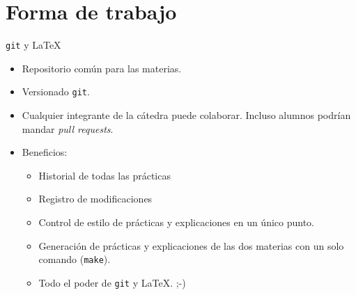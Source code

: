 \section{Forma de trabajo}
\begin{frame}{\texttt{git} y \LaTeX}
  \begin{itemize}
  \item Repositorio común para las materias.
  \item Versionado \texttt{git}.
  \item Cualquier integrante de la cátedra puede colaborar. Incluso alumnos
    podrían mandar \textit{pull requests}.
  \item Beneficios:
    \begin{itemize}
    \item Historial de todas las prácticas
    \item Registro de modificaciones
    \item Control de estilo de prácticas y explicaciones en un único punto.
    \item Generación de prácticas y explicaciones de las dos materias con
      un solo comando (\texttt{make}).
    \item Todo el poder de \texttt{git} y \LaTeX. ;-)
    \end{itemize}
  \end{itemize}
\end{frame}

